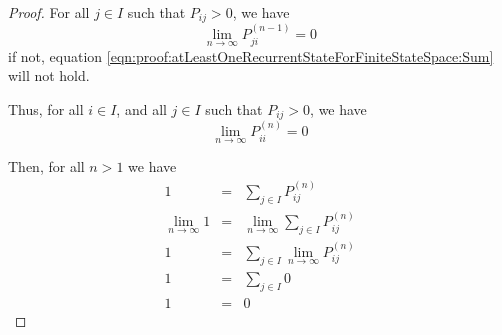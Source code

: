 \documentclass{article}
\begin{document}
\begin{enumerate}
\begin{proof}
          For all $j \in I$ such that $P_{ij} > 0$, we have
          \begin{equation}
            \lim_{n\rightarrow \infty} P_{ji}^{(n-1)} = 0
          \end{equation}
          if not, equation \ref{eqn:proof:atLeastOneRecurrentStateForFiniteStateSpace:Sum} will not hold.

          Thus, for all $i \in I$, and all $j \in I$ such that $P_{ij} > 0$, we have
          \begin{equation}
            \lim_{n \to \infty} P^{(n)}_{ii} = 0
          \end{equation}

          Then, for all $n > 1$ we have
          \begin{eqnarray}
            1 &=& \sum_{j \in I} P^{(n)}_{ij} \\
            \lim_{n \to \infty} 1 &=& \lim_{n \to \infty} \sum_{j \in I} P^{(n)}_{ij} \\
            1 &=& \sum_{j \in I} \lim_{n \to \infty} P^{(n)}_{ij} \\
            1 &=& \sum_{j \in I} 0 \\
            1 &=& 0
          \end{eqnarray}


\end{proof}
\end{enumerate}
\end{document}
